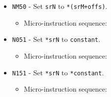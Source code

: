 \documentclass{article}
\def\specialtoaddr#1{\Verb|#1102| - output \Verb|sr#1| to addr bus}
\def\pkptrout{\Verb|0202| - output *\Verb|pk| to data bus}
\def\datatooffs{\Verb|4402| - write to \Verb|offs| from data bus}
\def\incrementpk{\Verb|0502| - increment \Verb|pk|}
\def\writeRAMo{\Verb|0104| - write data bus to *(addr bus+\Verb|offs|)}
\def\echodatalong{\Verb|0025| - echo data bus to itself for 3 cycles}
\def\done{\Verb|fffe| - end instruction}
\begin{document}
\begin{itemize}
    \item \Verb|NM50| - Set \Verb|srN| to \Verb|*(srM+offs)|.
    \begin{itemize}
        \item Micro-instruction sequence:
    \end{itemize}

    
    \item \Verb|N051| - Set \Verb|*srN| to \Verb|constant|.
    \begin{itemize}
        \item Micro-instruction sequence:
    \end{itemize}
    
    \item \Verb|N151| - Set \Verb|*srN| to \Verb|*constant|.
    \begin{itemize}
        \item Micro-instruction sequence:
    \end{itemize}
    

\end{itemize}
\end{document}
